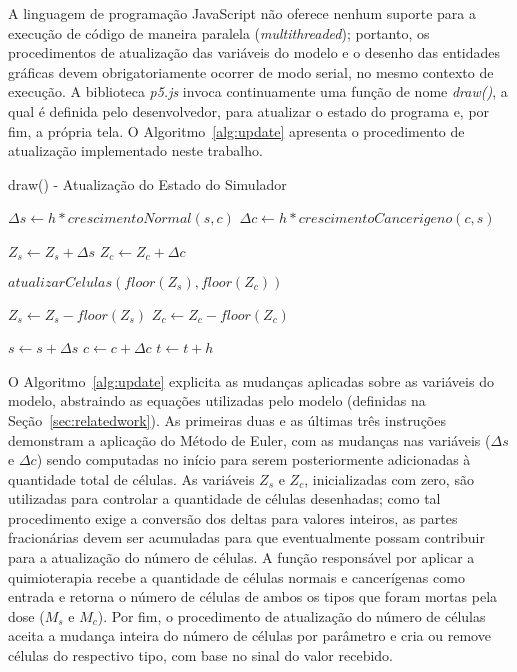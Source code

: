 \documentclass[12pt]{article}
\begin{document}
A linguagem de programação JavaScript não oferece nenhum suporte para a execução de código de maneira paralela (\textit{multithreaded}); portanto, os procedimentos de atualização das variáveis do modelo e o desenho das entidades gráficas devem obrigatoriamente ocorrer de modo serial, no mesmo contexto de execução. A biblioteca \emph{p5.js} invoca continuamente uma função de nome \emph{draw()}, a qual é definida pelo desenvolvedor, para atualizar o estado do programa e, por fim, a própria tela. O Algoritmo~\ref{alg:update} apresenta o procedimento de atualização implementado neste trabalho.

\begin{algorithm}[h]
  \small
  \DontPrintSemicolon
  \caption{draw() - Atualização do Estado do Simulador}
  \label{alg:update}

  $\Delta s \leftarrow h * crescimentoNormal(s, c)$
  $\Delta c \leftarrow h * crescimentoCancerigeno(c, s)$
  \BlankLine

  \BlankLine

  $Z_s \leftarrow Z_s + \Delta s$ \;
  $Z_c \leftarrow Z_c + \Delta c$ \;
  \BlankLine

  $atualizarCelulas(floor(Z_s), floor(Z_c))$\;
  \BlankLine

  $Z_s \leftarrow Z_s - floor(Z_s)$ \;
  $Z_c \leftarrow Z_c - floor(Z_c)$ \;
  \BlankLine

  $s \leftarrow s + \Delta s$ \;
  $c \leftarrow c + \Delta c$ \;
  $t \leftarrow t + h$ \;
\end{algorithm}

O Algoritmo~\ref{alg:update} explicita as mudanças aplicadas sobre as variáveis do modelo, abstraindo as equações utilizadas pelo modelo (definidas na Seção~\ref{sec:relatedwork}). As primeiras duas e as últimas três instruções demonstram a aplicação do Método de Euler, com as mudanças nas variáveis ($\Delta s$ e $\Delta c$) sendo computadas no início para serem posteriormente adicionadas à quantidade total de células. As variáveis $Z_s$ e $Z_c$, inicializadas com zero, são utilizadas para controlar a quantidade de células desenhadas; como tal procedimento exige a conversão dos deltas para valores inteiros, as partes fracionárias devem ser acumuladas para que eventualmente possam contribuir para a atualização do número de células. A função responsável por aplicar a quimioterapia recebe a quantidade de células normais e cancerígenas como entrada e retorna o número de células de ambos os tipos que foram mortas pela dose ($M_s$ e $M_c$). Por fim, o procedimento de atualização do número de células aceita a mudança inteira do número de células por parâmetro e cria ou remove células do respectivo tipo, com base no sinal do valor recebido.
\end{document}
